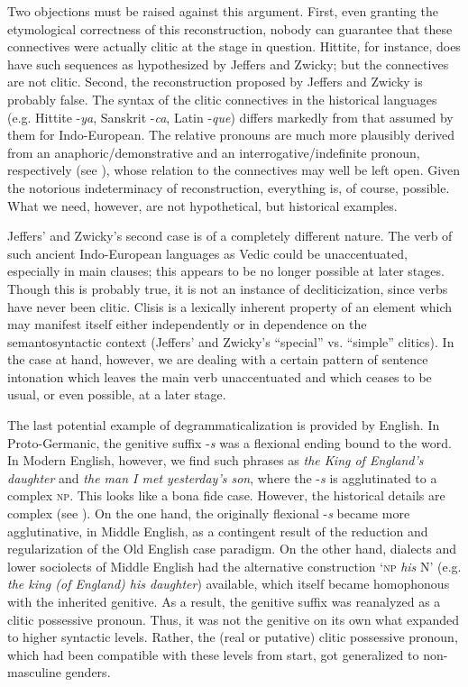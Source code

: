 Two objections must be raised against this argument. First, even granting the etymological correctness of this reconstruction, nobody can guarantee that these connectives were actually clitic at the stage in question. Hittite, for instance, does have such sequences as hypothesized by Jeffers and Zwicky; but the connectives are not clitic. Second, the reconstruction proposed by Jeffers and Zwicky is probably false. The syntax of the clitic connectives in the historical languages (e.g. Hittite -\textit{ya}, Sanskrit -\textit{ca}, Latin -\textit{que}) differs markedly from that assumed by them for Indo-European. The relative pronouns are much more plausibly derived from an anaphoric/demonstrative and an interrogative/indefinite pronoun, respectively (see \citealt[Ch. \textsc{vi}.1]{Lehmann1984}), whose relation to the connectives may well be left open. Given the notorious indeterminacy of reconstruction, everything is, of course, possible. What we need, however, are not hypothetical, but historical examples.

Jeffers' and Zwicky's second case is of a completely different nature. The verb of such ancient Indo-European languages as Vedic could be unaccentuated, especially in main clauses; this appears to be no longer possible at later stages. Though this is probably true, it is not an instance of decliticization, since verbs have never been clitic. Clisis is a lexically inherent property of an element which may manifest itself either independently or in dependence on the semantosyntactic context (Jeffers' and Zwicky's “special” vs. “simple” clitics). In the case at hand, however, we are dealing with a certain pattern of sentence intonation which leaves the main verb unaccentuated and which ceases to be usual, or even possible, at a later stage.

The last potential example of degrammaticalization is provided by English. In Proto-Germanic, the genitive suffix -\textit{s} was a flexional ending bound to the word. In Modern English, however, we find such phrases as \textit{the King of England's daughter} and \textit{the man I met yesterday's son}, where the -\textit{s} is agglutinated to a complex \textsc{np}. This looks like a bona fide case. However, the historical details are complex (see \citealt{Janda1980}). On the one hand, the originally flexional -\textit{s} became more agglutinative, in Middle English, as a contingent result of the reduction and regularization of the Old English case paradigm. On the other hand, dialects and lower sociolects of Middle English had the alternative construction ‘\textsc{np} \textit{his} N’ (e.g. \textit{the king (of England) his daughter}) available, which itself became homophonous with the inherited genitive. As a result, the genitive suffix was reanalyzed as a clitic possessive pronoun. Thus, it was not the genitive on its own what expanded to higher syntactic levels. Rather, the (real or putative) clitic possessive pronoun, which had been compatible with these levels from start, got generalized to non-masculine genders.

